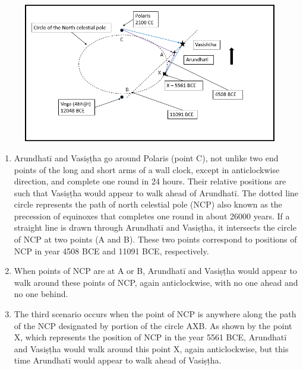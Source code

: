\begin{figure}[!h]
\includegraphics[scale=.3]{images/chap2-8.jpg}
\caption{}\label{chap1-fig7}
\end{figure}

\begin{enumerate}
\itemsep=0pt
\item Arundhatī and Vasiṣṭha go around Polaris (point C), not unlike two end points of the long and short arms of a wall clock, except in anticlockwise direction, and complete one round in 24 hours. Their relative positions are such that Vasiṣṭha would appear to walk ahead of Arundhatī. The dotted line circle represents the path of north celestial pole (NCP) also known as the precession of equinoxes that completes one round in about 26000 years. If a straight line is drawn through Arundhatī and Vasiṣṭha, it intersects the circle of NCP at two points (A and B). These two points correspond to positions of NCP in year 4508 BCE and 11091 BCE, respectively.

 \item When points of NCP are at A or B, Arundhatī and Vasiṣṭha would appear to walk around these points of NCP, again anticlockwise, with no one ahead and no one behind.

 \item The third scenario occurs when the point of NCP is anywhere along the path of the NCP designated by portion of the circle AXB. As shown by the point X, which represents the position of NCP in the year 5561 BCE, Arundhatī and Vasiṣṭha would walk around this point X, again anticlockwise, but this time Arundhatī would appear to walk ahead of Vasiṣṭha.

\end{enumerate}

